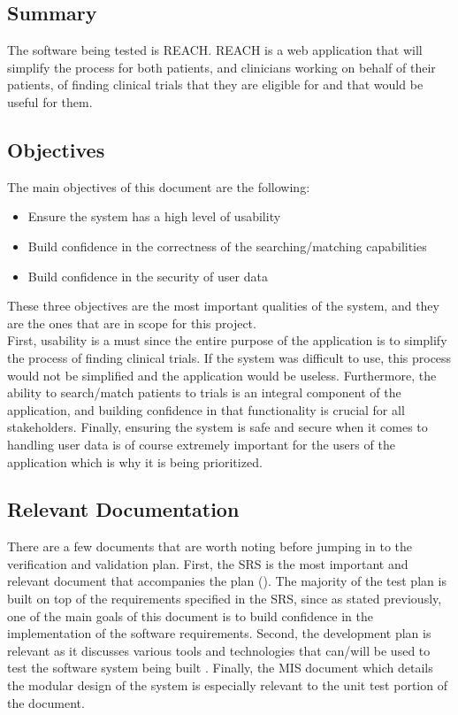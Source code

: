 \documentclass[12pt, titlepage]{article}
\begin{document}
\subsection{Summary}

The software being tested is REACH. REACH is a web application that will simplify the process for both patients, and clinicians working 
on behalf of their patients, of finding clinical trials that they are eligible for and that would be useful for them.

\subsection{Objectives}

The main objectives of this document are the following:

\begin{itemize}
  \item Ensure the system has a high level of usability
  \item Build confidence in the correctness of the searching/matching capabilities
  \item Build confidence in the security of user data
\end{itemize}

These three objectives are the most important qualities of the system, and they are the ones that are in scope for this project. \\

First, usability is a must
since the entire purpose of the application is to simplify the process of finding clinical trials. If the system was difficult to use, this process 
would not be simplified and the application would be useless. 
Furthermore, the ability to search/match patients to trials is an integral component of the application, and building confidence in 
that functionality is crucial for all stakeholders. Finally, ensuring the system is safe and secure when it comes to handling user data is of course 
extremely important for the users of the application which is why it is being prioritized.

\subsection{Relevant Documentation}

There are a few documents that are worth noting before jumping in to the verification and validation plan.
First, the SRS is the most important and relevant document that accompanies the plan  (\citet{SRS}). The majority of the test plan 
is built on top of the requirements specified in the SRS, since as stated previously, one of the main goals of this document is to 
build confidence in the implementation of the software requirements. Second, the development plan is relevant as it discusses various tools 
and technologies that can/will be used to test the software system being built {\citet{DevPlan}}. Finally, the MIS document which details the modular design 
of the system is especially relevant to the unit test portion of the document.
\end{document}
